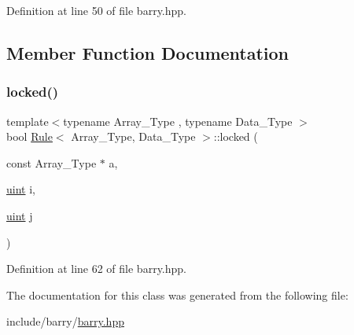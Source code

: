 Definition at line 50 of file barry.\+hpp.



\subsection{Member Function Documentation}
\mbox{\label{classbarry_1_1_rule_a0a9a115c6951a5c8de699d4ff9f69060}} 
\subsubsection{\texorpdfstring{locked()}{locked()}}
{\footnotesize\ttfamily template$<$typename Array\+\_\+\+Type , typename Data\+\_\+\+Type $>$ \\
bool \hyperlink{classbarry_1_1_rule}{Rule}$<$ Array\+\_\+\+Type, Data\+\_\+\+Type $>$\+::locked (\begin{DoxyParamCaption}\item[{const Array\+\_\+\+Type $\ast$}]{a,  }\item[{\hyperlink{namespacebarry_a11dfc53ddb4672278319aa04f1e09a6c}{uint}}]{i,  }\item[{\hyperlink{namespacebarry_a11dfc53ddb4672278319aa04f1e09a6c}{uint}}]{j }\end{DoxyParamCaption})\hspace{0.3cm}{\ttfamily [inline]}}



Definition at line 62 of file barry.\+hpp.



The documentation for this class was generated from the following file\+:\begin{DoxyCompactItemize}
\item 
include/barry/\hyperlink{barry_8hpp}{barry.\+hpp}\end{DoxyCompactItemize}
